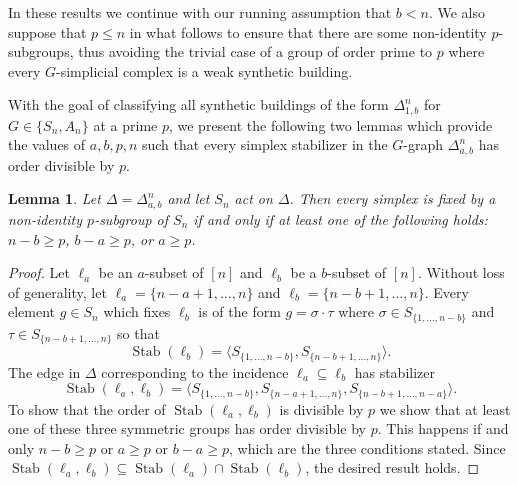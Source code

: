 \documentclass[12pt]{amsart}
\theoremstyle{plain}
\newtheorem{lemma}[theorem]{Lemma}
\theoremstyle{definition}
\theoremstyle{remark}
\numberwithin{equation}{section}
\DeclareMathOperator{\Stab}{Stab}
\begin{document}
In these results we continue with our running assumption that $b<n$. We also suppose that $p\le n$ in what follows to ensure that there are some non-identity $p$-subgroups, thus avoiding the trivial case of a group of order prime to $p$ where every $G$-simplicial complex is a weak synthetic building.

With the goal of classifying all synthetic buildings of the form $\Delta^n_{1,b}$ for $G\in\{S_n,A_n\}$ at a prime $p$, we present the following two lemmas which provide the values of $a,b,p,n$ such that every simplex stabilizer in the $G$-graph $\Delta^n_{a,b}$ has order divisible by $p$. 

\begin{lemma}\label{lem:sn_stabsbyp}
    Let $\Delta=\Delta^n_{a,b}$ and let $S_n$ act on $\Delta$. Then every simplex is fixed by a non-identity $p$-subgroup of $S_n$ if and only if at least one of the following holds: $n-b\geq p$, $b-a\geq p$, or $a\geq p$.
\end{lemma}
\begin{proof}
Let $\ell_a$ be an $a$-subset of $[n]$ and $\ell_b$ be a $b$-subset of $[n]$.
Without loss of generality, let $\ell_a=\{n-a+1,\ldots,n\}$ and $\ell_b=\{n-b+1,\ldots,n\}$. Every element $g\in S_n$ which fixes $\ell_b$ is of the form $g=\sigma\cdot\tau$ where $\sigma\in S_{\{1,\ldots,n-b\}}$ and $\tau\in S_{\{n-b+1,\ldots,n\}}$ so that
$$\Stab(\ell_b)=\langle S_{\{1,\ldots,n-b\}}, S_{\{n-b+1,\ldots,n\}}\rangle.$$
The edge in $\Delta$ corresponding to the incidence $\ell_a\subseteq \ell_b$ has stabilizer
$$\Stab(\ell_a,\ell_b) = \langle S_{\{1,\ldots,n-b\}}, S_{\{n-a+1,\ldots,n\}}, S_{\{n-b+1,\ldots,n-a\}}\rangle.$$
To show that the order of $\Stab(\ell_a,\ell_b)$ is divisible by $p$ we show that at least one of these three symmetric groups has order divisible by $p$. This happens if and only $n-b\geq p$ or $a\geq p$ or $b-a\geq p$, which are the three conditions stated.
Since $\Stab(\ell_a,\ell_b)\subseteq\Stab(\ell_a)\cap \Stab(\ell_b)$, the desired result holds.
\end{proof}
\end{document}
